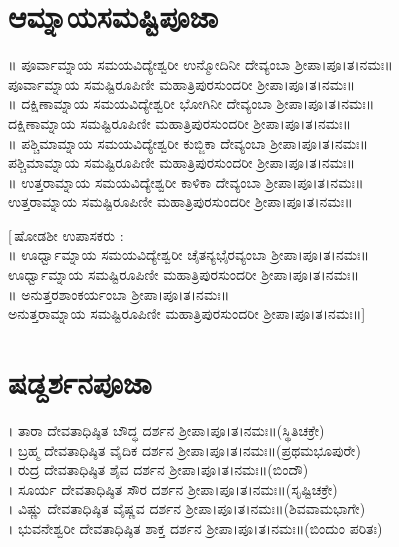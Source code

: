 \section{ಆಮ್ನಾಯಸಮಷ್ಟಿಪೂಜಾ}
॥ ಪೂರ್ವಾಮ್ನಾಯ ಸಮಯವಿದ್ಯೇಶ್ವರೀ ಉನ್ಮೋದಿನೀ ದೇವ್ಯಂಬಾ ಶ್ರೀಪಾ।ಪೂ।ತ।ನಮಃ॥\\
 ಪೂರ್ವಾಮ್ನಾಯ ಸಮಷ್ಟಿರೂಪಿಣೀ ಮಹಾತ್ರಿಪುರಸುಂದರೀ ಶ್ರೀಪಾ।ಪೂ।ತ।ನಮಃ॥\\
॥ ದಕ್ಷಿಣಾಮ್ನಾಯ ಸಮಯವಿದ್ಯೇಶ್ವರೀ ಭೋಗಿನೀ ದೇವ್ಯಂಬಾ ಶ್ರೀಪಾ।ಪೂ।ತ।ನಮಃ॥\\
 ದಕ್ಷಿಣಾಮ್ನಾಯ ಸಮಷ್ಟಿರೂಪಿಣೀ ಮಹಾತ್ರಿಪುರಸುಂದರೀ ಶ್ರೀಪಾ।ಪೂ।ತ।ನಮಃ॥\\
॥ ಪಶ್ಚಿಮಾಮ್ನಾಯ ಸಮಯವಿದ್ಯೇಶ್ವರೀ ಕುಬ್ಜಿಕಾ ದೇವ್ಯಂಬಾ ಶ್ರೀಪಾ।ಪೂ।ತ।ನಮಃ॥\\
 ಪಶ್ಚಿಮಾಮ್ನಾಯ ಸಮಷ್ಟಿರೂಪಿಣೀ ಮಹಾತ್ರಿಪುರಸುಂದರೀ ಶ್ರೀಪಾ।ಪೂ।ತ।ನಮಃ॥\\
॥ ಉತ್ತರಾಮ್ನಾಯ ಸಮಯವಿದ್ಯೇಶ್ವರೀ ಕಾಳಿಕಾ ದೇವ್ಯಂಬಾ ಶ್ರೀಪಾ।ಪೂ।ತ।ನಮಃ॥\\
 ಉತ್ತರಾಮ್ನಾಯ ಸಮಷ್ಟಿರೂಪಿಣೀ ಮಹಾತ್ರಿಪುರಸುಂದರೀ ಶ್ರೀಪಾ।ಪೂ।ತ।ನಮಃ॥

 [\,ಷೋಡಶೀ ಉಪಾಸಕರು :\\
 ॥ ಊರ್ಧ್ವಾಮ್ನಾಯ ಸಮಯವಿದ್ಯೇಶ್ವರೀ ಚೈತನ್ಯಭೈರವ್ಯಂಬಾ ಶ್ರೀಪಾ।ಪೂ।ತ।ನಮಃ॥\\
 ಊರ್ಧ್ವಾಮ್ನಾಯ ಸಮಷ್ಟಿರೂಪಿಣೀ ಮಹಾತ್ರಿಪುರಸುಂದರೀ ಶ್ರೀಪಾ।ಪೂ।ತ।ನಮಃ॥\\
॥ ಅನುತ್ತರಶಾಂಕರ್ಯಂಬಾ ಶ್ರೀಪಾ।ಪೂ।ತ।ನಮಃ॥\\
 ಅನುತ್ತರಾಮ್ನಾಯ ಸಮಷ್ಟಿರೂಪಿಣೀ ಮಹಾತ್ರಿಪುರಸುಂದರೀ ಶ್ರೀಪಾ।ಪೂ।ತ।ನಮಃ॥]\,
\section{ಷಡ್ದರ್ಶನಪೂಜಾ}
। ತಾರಾ ದೇವತಾಧಿಷ್ಠಿತ ಬೌದ್ಧ ದರ್ಶನ ಶ್ರೀಪಾ।ಪೂ।ತ।ನಮಃ॥(ಸ್ಥಿತಿಚಕ್ರೇ)\\
। ಬ್ರಹ್ಮ ದೇವತಾಧಿಷ್ಠಿತ ವೈದಿಕ ದರ್ಶನ ಶ್ರೀಪಾ।ಪೂ।ತ।ನಮಃ॥(ಪ್ರಥಮಭೂಪುರೇ)\\
 । ರುದ್ರ ದೇವತಾಧಿಷ್ಠಿತ ಶೈವ ದರ್ಶನ ಶ್ರೀಪಾ।ಪೂ।ತ।ನಮಃ॥(ಬಿಂದೌ)\\
। ಸೂರ್ಯ ದೇವತಾಧಿಷ್ಠಿತ ಸೌರ ದರ್ಶನ ಶ್ರೀಪಾ।ಪೂ।ತ।ನಮಃ॥(ಸೃಷ್ಟಿಚಕ್ರೇ)\\
। ವಿಷ್ಣು ದೇವತಾಧಿಷ್ಠಿತ ವೈಷ್ಣವ ದರ್ಶನ ಶ್ರೀಪಾ।ಪೂ।ತ।ನಮಃ॥(ಶಿವವಾಮಭಾಗೇ)\\
। ಭುವನೇಶ್ವರೀ ದೇವತಾಧಿಷ್ಠಿತ ಶಾಕ್ತ ದರ್ಶನ ಶ್ರೀಪಾ।ಪೂ।ತ।ನಮಃ॥(ಬಿಂದುಂ ಪರಿತಃ)
\newpage
